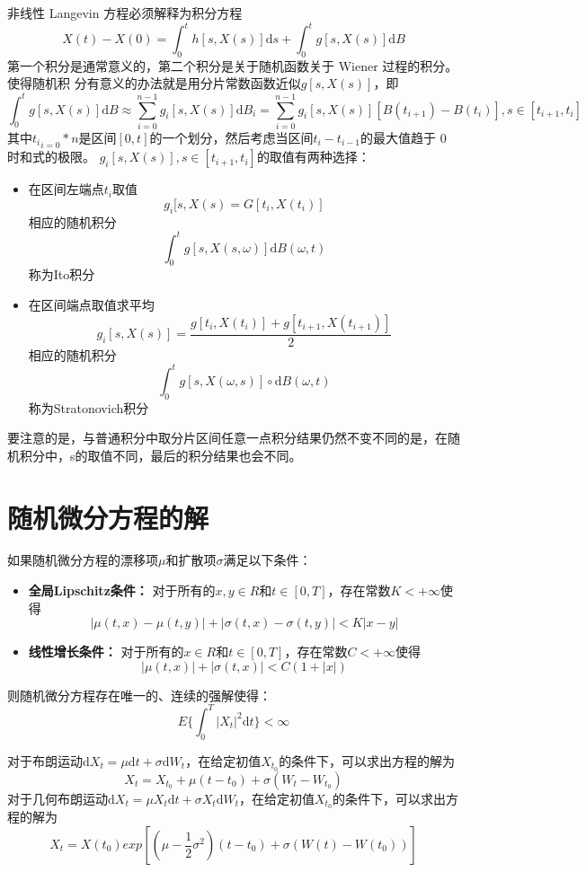 \documentclass{article}
\begin{document}
非线性 Langevin 方程必须解释为积分方程$$X(t)-X(0)=\int_0^t h[s,X(s)]\mathrm{d}s + \int_0^t g[s,X(s)]\mathrm{d}B$$第一个积分是通常意义的，第二个积分是关于随机函数关于 Wiener 过程的积分。使得随机积
分有意义的办法就是用分片常数函数近似$g[s,X(s)]$，即$$\int_0^tg[s,X(s)]\mathrm{d}B \approx \sum_{i=0}^{n-1}g_i[s,X(s)]\mathrm{d}B_i = \sum_{i=0}^{n-1}g_i[s,X(s)][B(t_{i+1})-B(t_i)], s \in [t_{i+1},t_i]$$其中${t_i}_{i=0}*n$是区间$[0,t]$的一个划分，然后考虑当区间$t_i - t_{i-1}$的最大值趋于 0 时和式的极限。
$g_i[s,X(s)], s \in [t_{i+1},t_i]$的取值有两种选择：

\begin{itemize}
\item 在区间左端点$t_i$取值
$$g_i[s,X(s)=G[t_i, X(t_i)]$$
相应的随机积分
$$\int_0^t g[s,X(s,\omega)]\mathrm{d}B(\omega,t)$$
称为Ito积分

\item 在区间端点取值求平均$$g_i[s,X(s)]=\frac{g[t_i,X(t_i)]+g[t_{i+1},X(t_{i+1})]}{2}$$
			相应的随机积分$$\int_0^t g[s,X(\omega,s)]∘\mathrm{d}B(\omega,t)$$
			称为Stratonovich积分
\end{itemize}

要注意的是，与普通积分中取分片区间任意一点积分结果仍然不变不同的是，在随机积分中，s的取值不同，最后的积分结果也会不同。



\section{随机微分方程的解}
如果随机微分方程的漂移项$\mu$和扩散项$\sigma$满足以下条件：

\begin{itemize}
	\item \textbf{全局Lipschitz条件：} 对于所有的$x,y \in R$和$t \in [0,T]$，存在常数$K<+\infty$使得$$|\mu(t,x)-\mu(t,y)|+|\sigma(t,x)-\sigma(t,y)|<K|x-y|$$

	\item \textbf{线性增长条件：} 对于所有的$x \in R$和$t \in [0,T]$，存在常数$C < +\infty$使得$$|\mu(t,x)|+|\sigma(t,x)|<C(1+|x|)$$
\end{itemize}

则随机微分方程存在唯一的、连续的强解使得：$$E\{\int_0^T|X_t|^2\mathrm{d}t\}<\infty$$

对于布朗运动$\mathrm{d}X_t=\mu\mathrm{d}t+\sigma\mathrm{d}W_t$，在给定初值$X_{t_0}$的条件下，可以求出方程的解为$$X_t=X_{t_0}+\mu(t-t_0)+\sigma(W_t-W_{t_0})$$对于几何布朗运动$\mathrm{d}X_t=\mu X_t\mathrm{d}t+\sigma X_t\mathrm{d}W_t$，在给定初值$X_{t_0}$的条件下，可以求出方程的解为$$X_t=X(t_0)exp[(\mu-\frac{1}{2}\sigma^2)(t-t_0)+\sigma(W(t)-W(t_0))]$$
\end{document}
